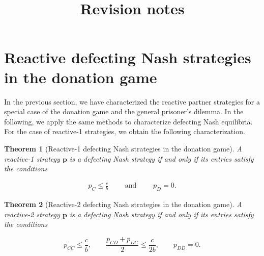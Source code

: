 \documentclass[11pt]{article}
\title{~\\[-1.5cm]{\sffamily \Large Revision notes}\\[-0.3cm]}
\date{\empty}
\theoremstyle{plainCl1}
\newtheorem{theorem}{Theorem}
\theoremstyle{plainCl2}
\begin{document}

\section{Reactive defecting Nash strategies in the donation game}\label{section:defecting_donation_game}

In the previous section, we have characterized the reactive partner strategies
for a special case of the donation game and the general prisoner's dilemma. In
the following, we apply the same methods to
characterize defecting Nash equilibria. For the case of reactive-1 strategies, we
obtain the following characterization.


\begin{theorem}[Reactive-1 defecting Nash strategies in the donation game]
\label{theorem:reactive_one_defecting_strategies}
A reactive-1 strategy $\mathbf{p}$ is a defecting Nash strategy if and only if
its entries satisfy the conditions

\begin{equation}
  \begin{array}{rcl}
    p_{C} \le  \frac{c}{b} \qquad \text{ and } \qquad  p_{D} \!=\! 0.
\end{array}
\end{equation}
\end{theorem}



\begin{theorem}[Reactive-2 defecting Nash strategies in the donation game]
\label{theorem:reactive_two_defecting_strategies}
A reactive-2 strategy $\mathbf{p}$ is a defecting Nash strategy if and only if
its entries satisfy the conditions

\begin{equation}\label{eq:defecting_conditions_two}
  p_{CC} \le \frac{c}{b}, \qquad \displaystyle \frac{p_{CD} \!+\! p_{DC}}{2} \le \frac{c}{2b}, \qquad p_{DD} = 0.
\end{equation}
\end{theorem}

\end{document}
